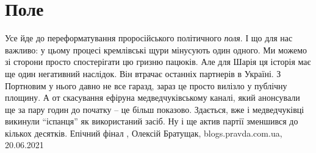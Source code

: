  
 
 
 
 
\chapter{Поле}

Усе йде до переформатування проросійського політичного \emph{поля}. І що для нас
важливо: у цьому процесі кремлівські щури мінусують один одного. Ми можемо зі
сторони просто спостерігати цю гризню пацюків.  Але для Шарія ця історія має ще
один негативний наслідок. Він втрачає останніх партнерів в Україні. З Портновим
у нього давно не все гаразд, зараз це просто вилізло у публічну площину. А от
скасування ефіруна медведчуківському каналі, який анонсували ще за пару годин
до початку – це більш показово. Здається, вже і медведчуківці викинули
\enquote{іспанця} як використаний засіб. Ну і ще актив партії зменшився до кількох
десятків. Епічний фінал
, Олексій Братущак, blogs.pravda.com.ua, 20.06.2021
